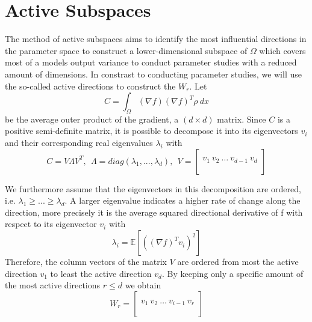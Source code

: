 \documentclass[
  a4paper,  %
  twoside,  %
  bibliography=totoc,
  headsepline,
  cleardoublepage=empty,
  parskip=half,
  draft=false
]{scrbook}
\begin{document}
\section{Active Subspaces}


The method of active subspaces \cite{CG15} aims to identify the most influential directions in the parameter space to construct a lower-dimensional subspace of $\Omega$ which covers most of a models output variance to conduct parameter studies with a reduced amount of dimensions.
In constrast to conducting parameter studies, we will use the so-called active directions to construct the $W_r$.
Let
\begin{equation}
C = \int_{\Omega} (\nabla f) (\nabla f)^T \rho ~ dx
\label{as_c}
\end{equation}
be the average outer product of the gradient, a $(d \times d)$ matrix.
Since $C$ is a positive semi-definite matrix, it is possible to decompose it into its eigenvectors $v_i$ and their corresponding real eigenvalues $\lambda_i$ with
\begin{equation}
C = V \Lambda V^T, ~~ \Lambda = diag(\lambda_1, ..., \lambda_d), ~~ V=
  \begin{bmatrix}
  \\
    v_1 ~ v_2 ~ \dots ~ v_{d-1} ~ v_d\\
    \\
  \end{bmatrix}
\nonumber
\end{equation}

We furthermore assume that the eigenvectors in this decomposition are ordered, i.e. $\lambda_1 \geq ... \geq \lambda_d$.
A larger eigenvalue indicates a higher rate of change along the direction, more precisely it is the average squared directional derivative of f with respect to its eigenvector $v_i$ \cite{CG14} with
\begin{equation}
\lambda_i=\mathds{E}[((\nabla f)^T v_i)^2]
\label{eigenvalues}
\end{equation}
Therefore, the column vectors of the matrix $V$ are ordered from most the active direction $v_1$ to least the active direction $v_d$.
By keeping only a specific amount of the most active directions $r \leq d$ we obtain
\begin{equation}
W_r=\begin{bmatrix}
  \\
    v_1 ~ v_2 ~ \dots ~ v_{i-1} ~ v_r\\
    \\
  \end{bmatrix}
\label{basis}
\end{equation}
\end{document}

